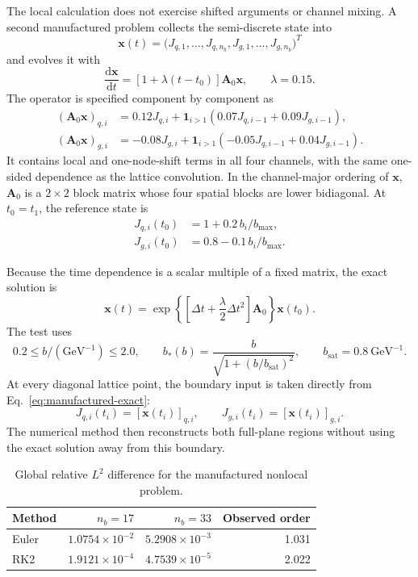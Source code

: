 \documentclass[11pt]{article}
\newcommand{\dd}{\mathrm{d}}
\begin{document}
The local calculation does not exercise shifted arguments or channel mixing.
A second manufactured problem collects the semi-discrete state into
\[
  \bm x(t)=
  \bigl(J_{q,1},\ldots,J_{q,n_b},
        J_{g,1},\ldots,J_{g,n_b}\bigr)^T
\]
and evolves it with
\begin{equation}
  \frac{\dd\bm x}{\dd t}
  =
  \left[1+\lambda(t-t_0)\right]\bm A_0\bm x,
  \qquad
  \lambda=0.15.
  \label{eq:manufactured-ode}
\end{equation}
The operator is specified component by component as
\begin{align}
  (\bm A_0\bm x)_{q,i}
  &=
  0.12J_{q,i}
  +\mathbf{1}_{i>1}
  \left(0.07J_{q,i-1}+0.09J_{g,i-1}\right),
  \\
  (\bm A_0\bm x)_{g,i}
  &=
  -0.08J_{g,i}
  +\mathbf{1}_{i>1}
  \left(-0.05J_{q,i-1}+0.04J_{g,i-1}\right).
  \label{eq:manufactured-operator}
\end{align}
It contains local and one-node-shift terms in all four channels, with the
same one-sided dependence as the lattice convolution. In the channel-major
ordering of \(\bm x\), \(\bm A_0\) is a \(2\times2\) block matrix whose four
spatial blocks are lower bidiagonal. At
\(t_0=t_1\), the reference state is
\begin{align}
  J_{q,i}(t_0)&=1+0.2\,b_i/b_{\max},\\
  J_{g,i}(t_0)&=0.8-0.1\,b_i/b_{\max}.
  \label{eq:manufactured-initial}
\end{align}

Because the time dependence is a scalar multiple of a fixed matrix, the exact
solution is
\begin{equation}
  \bm x(t)
  =
  \exp\left\{
    \left[
      \Delta t+\frac{\lambda}{2}\Delta t^2
    \right]\bm A_0
  \right\}\bm x(t_0).
  \label{eq:manufactured-exact}
\end{equation}
The test uses
\[
  0.2\le b/(\mathrm{GeV}^{-1})\le2.0,\qquad
  b_*(b)=\frac{b}{\sqrt{1+(b/b_{\mathrm{sat}})^2}},
  \qquad b_{\mathrm{sat}}=0.8~\mathrm{GeV}^{-1}.
\]
At every diagonal lattice point, the boundary input is taken directly from
Eq.~\eqref{eq:manufactured-exact}:
\[
  J_{q,i}(t_i)=[\bm x(t_i)]_{q,i},
  \qquad
  J_{g,i}(t_i)=[\bm x(t_i)]_{g,i}.
\]
The numerical method then reconstructs both full-plane regions without using
the exact solution away from this boundary.

\begin{table}[H]
\centering
\caption{Global relative \(L^2\) difference for the manufactured nonlocal
problem.}
\label{tab:nonlocal-results}
\begin{tabular}{lrrr}
\toprule
Method & \(n_b=17\) & \(n_b=33\) & Observed order\\
\midrule
Euler & \(1.0754\times10^{-2}\) & \(5.2908\times10^{-3}\) & 1.031\\
RK2 & \(1.9121\times10^{-4}\) & \(4.7539\times10^{-5}\) & 2.022\\
\bottomrule
\end{tabular}
\end{table}
\end{document}

